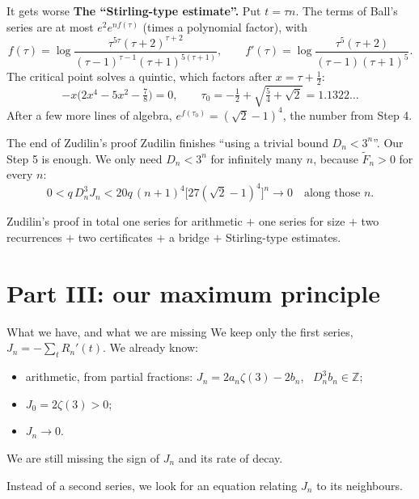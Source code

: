 \documentclass[aspectratio=169,11pt]{beamer}
\newcommand{\Z}{\mathbb{Z}}
\newcommand{\Dn}{D_n}
\begin{document}
\begin{frame}{It gets worse}
  \textbf{The ``Stirling-type estimate''.} Put $t=\tau n$. The terms of Ball's series are at most
  $e^2e^{nf(\tau)}$ (times a polynomial factor), with
  {\small
  \[
    f(\tau)=\log\frac{\tau^{5\tau}(\tau+2)^{\tau+2}}{(\tau-1)^{\tau-1}(\tau+1)^{5(\tau+1)}},
    \qquad
    f'(\tau)=\log\frac{\tau^5(\tau+2)}{(\tau-1)(\tau+1)^5}.
  \]
  The critical point solves a quintic, which factors after $x=\tau+\tfrac12$:
  \[
    -x\bigl(2x^4-5x^2-\tfrac78\bigr)=0,
    \qquad
    \tau_0=-\tfrac12+\sqrt{\tfrac54+\sqrt2}=1.1322\ldots
  \]}%
  After a few more lines of algebra, $e^{f(\tau_0)}=(\sqrt2-1)^4$, the number from Step 4.
\end{frame}

\begin{frame}{The end of Zudilin's proof}
  Zudilin finishes ``using a trivial bound $\Dn<3^n$''. Our Step 5 is enough.
  We only need $\Dn<3^n$ for infinitely many $n$, because $\widetilde F_n>0$ for every $n$:
  \[
    0<q\,\Dn^3J_n<20q\,(n+1)^4\bigl[27(\sqrt2-1)^4\bigr]^n\longrightarrow0
    \quad\text{along those }n .
  \]
  \begin{block}{Zudilin's proof in total}
    one series for arithmetic $+$ one series for size $+$ two recurrences
    $+$ two certificates $+$ a bridge $+$ Stirling-type estimates.
  \end{block}
\end{frame}

\section{Part III: our maximum principle}

\begin{frame}{What we have, and what we are missing}
  We keep only the first series, $J_n=-\sum_tR_n'(t)$. We already know:
  \begin{itemize}
    \item arithmetic, from partial fractions: $J_n=2a_n\zeta(3)-2b_n$, \ $\Dn^3b_n\in\Z$;
    \item $J_0=2\zeta(3)>0$;
    \item $J_n\to0$.
  \end{itemize}
  \pause
  \medskip
  We are still missing the \alert{sign} of $J_n$ and its \alert{rate of decay}.
  \pause
  \medskip

  Instead of a second series, we look for an equation relating $J_n$ to its neighbours.
\end{frame}
\end{document}
